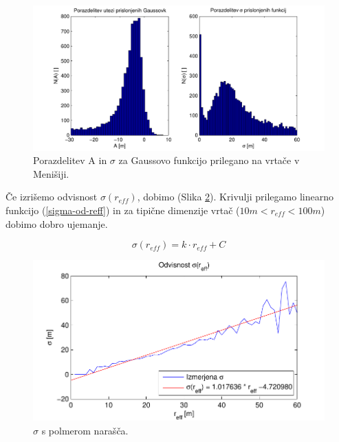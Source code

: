 \documentclass[a4paper, twoside, 12pt]{book}
\begin{document}
  \begin{figure}[h!]
    \begin{center}
      \includegraphics[width=14cm]{slike/menisija-visine-in-sigme-hist}
    \end{center}
    \caption{Porazdelitev A in $\sigma$ za Gaussovo funkcijo prilegano na vrtače v Menišiji.}
    \label{fig:menisija-globine-sigme-hist}
  \end{figure}

Če izrišemo odvisnost $\sigma (r_{eff})$, dobimo (Slika \ref{fig:menisija-sigma}). Krivulji prilegamo linearno funkcijo (\ref{sigma-od-reff}) in za tipične dimenzije vrtač ($10m < r_{eff} < 100m$) dobimo dobro ujemanje.

  \begin{equation}
    \sigma (r_{eff}) = k \cdot r_{eff} + C
    \label{sigma-od-reff}
  \end{equation}
  \begin{figure}[h!]
    \begin{center}
      \includegraphics[width=12cm]{slike/menisija-sigme}
    \end{center}
    \caption{$\sigma$ s polmerom narašča.}
    \label{fig:menisija-sigma}
  \end{figure}
\end{document}

